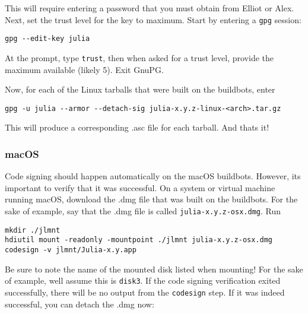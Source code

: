 This will require entering a password that you must obtain from Elliot or Alex. Next, set the trust level for the key to maximum. Start by entering a \texttt{gpg} session:




\begin{lstlisting}
gpg --edit-key julia
\end{lstlisting}



At the prompt, type \texttt{trust}, then when asked for a trust level, provide the maximum available (likely 5). Exit GnuPG.



Now, for each of the Linux tarballs that were built on the buildbots, enter




\begin{lstlisting}
gpg -u julia --armor --detach-sig julia-x.y.z-linux-<arch>.tar.gz
\end{lstlisting}



This will produce a corresponding .asc file for each tarball. And that{\textquotesingle}s it!



\hypertarget{12383401899447558259}{}


\subsubsection{macOS}



Code signing should happen automatically on the macOS buildbots. However, it{\textquotesingle}s important to verify that it was successful. On a system or virtual machine running macOS, download the .dmg file that was built on the buildbots. For the sake of example, say that the .dmg file is called \texttt{julia-x.y.z-osx.dmg}. Run




\begin{lstlisting}
mkdir ./jlmnt
hdiutil mount -readonly -mountpoint ./jlmnt julia-x.y.z-osx.dmg
codesign -v jlmnt/Julia-x.y.app
\end{lstlisting}



Be sure to note the name of the mounted disk listed when mounting! For the sake of example, we{\textquotesingle}ll assume this is \texttt{disk3}. If the code signing verification exited successfully, there will be no output from the \texttt{codesign} step. If it was indeed successful, you can detach the .dmg now:




